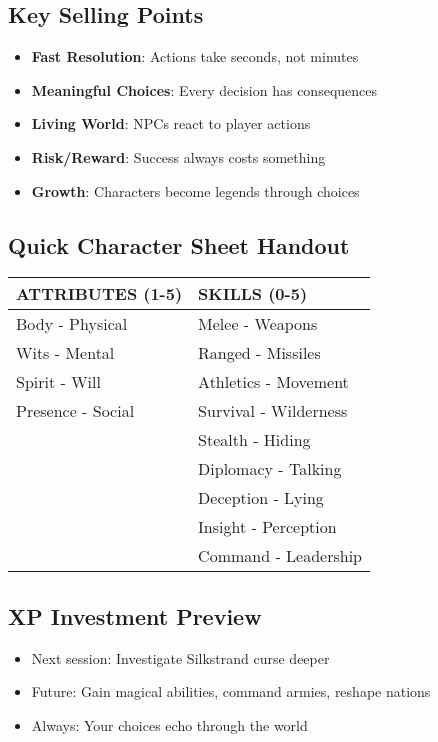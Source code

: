 \documentclass[11pt]{article}
\begin{document}
\subsection*{Key Selling Points}
\begin{itemize}
\item {} \textbf{Fast Resolution}: Actions take seconds, not minutes
\item {} \textbf{Meaningful Choices}: Every decision has consequences
\item {} \textbf{Living World}: NPCs react to player actions
\item {} \textbf{Risk/Reward}: Success always costs something
\item {} \textbf{Growth}: Characters become legends through choices
\end{itemize}

\subsection*{Quick Character Sheet Handout}
\begin{center}
\begin{tabular}{|l|l|}
\hline
\textbf{ATTRIBUTES (1-5)} & \textbf{SKILLS (0-5)} \\
\hline
Body - Physical & Melee - Weapons \\
Wits - Mental & Ranged - Missiles \\
Spirit - Will & Athletics - Movement \\
Presence - Social & Survival - Wilderness \\
& Stealth - Hiding \\
& Diplomacy - Talking \\
& Deception - Lying \\
& Insight - Perception \\
& Command - Leadership \\
\hline
\end{tabular}
\end{center}

\subsection*{XP Investment Preview}
\begin{itemize}
\item Next session: Investigate Silkstrand curse deeper
\item Future: Gain magical abilities, command armies, reshape nations
\item Always: Your choices echo through the world
\end{itemize}
\end{document}
